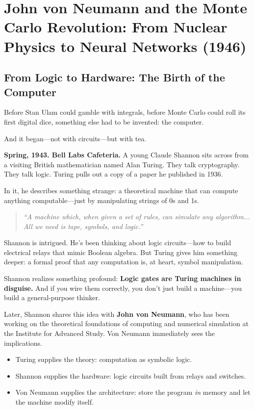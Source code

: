 \section{John von Neumann and the Monte Carlo Revolution: From Nuclear Physics to Neural Networks (1946)}


\subsection{From Logic to Hardware: The Birth of the Computer}

Before Stan Ulam could gamble with integrals, before Monte Carlo could roll its first digital dice, something else had to be invented: the computer.

And it began—not with circuits—but with tea.

\medskip

\noindent\textbf{Spring, 1943. Bell Labs Cafeteria.} A young Claude Shannon sits across from a visiting British mathematician named Alan Turing. They talk cryptography. They talk logic. Turing pulls out a copy of a paper he published in 1936.

In it, he describes something strange: a theoretical machine that can compute anything computable—just by manipulating strings of 0s and 1s.

\begin{quote}
\textit{“A machine which, when given a set of rules, can simulate any algorithm... All we need is tape, symbols, and logic.”}
\end{quote}

Shannon is intrigued. He’s been thinking about logic circuits—how to build electrical relays that mimic Boolean algebra. But Turing gives him something deeper: a formal proof that any computation is, at heart, symbol manipulation.

Shannon realizes something profound:  
\textbf{Logic gates are Turing machines in disguise.}  
And if you wire them correctly, you don’t just build a machine—you build a general-purpose thinker.

\medskip

Later, Shannon shares this idea with \textbf{John von Neumann}, who has been working on the theoretical foundations of computing and numerical simulation at the Institute for Advanced Study. Von Neumann immediately sees the implications.

\begin{itemize}
  \item Turing supplies the theory: computation as symbolic logic.
  \item Shannon supplies the hardware: logic circuits built from relays and switches.
  \item Von Neumann supplies the architecture: store the program \emph{in} memory and let the machine modify itself.
\end{itemize}

